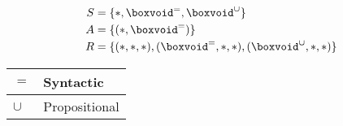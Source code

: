 \documentclass[preview]{standalone}
\begin{document}
\begin{align*}
S &= \{*, \boxvoid^=, \boxvoid^\cup \} \\
A &= \{(*, \boxvoid^=)\} \\
R &= \{(*,*,*), (\boxvoid^=,*,*), (\boxvoid^\cup,*,*) \} \\
\end{align*}
\begin{center}
\begin{tabular}{ | l | l | }
\hline
$ = $ & Syntactic \\
\hline
$ \cup $ & Propositional \\
\hline
\end{tabular}
\end{center}
\vspace{0 mm}
\end{document}
